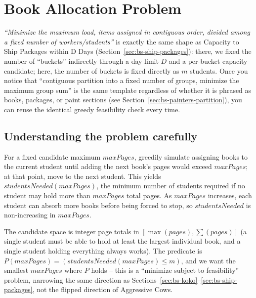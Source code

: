\section{Book Allocation Problem}
\label{sec:bs-book-allocation}


\begin{patternbox}
\emph{``Minimize the maximum load, items assigned in contiguous order,
divided among a fixed number of workers/students''} is exactly the same
shape as Capacity to Ship Packages within D Days
(Section~\ref{sec:bs-ship-packages}): there, we fixed the number of
``buckets'' indirectly through a day limit $D$ and a per-bucket capacity
candidate; here, the number of buckets is fixed directly as $m$ students.
Once you notice that ``contiguous partition into a fixed number of groups,
minimize the maximum group sum'' is the same template regardless of
whether it is phrased as books, packages, or paint sections (see
Section~\ref{sec:bs-painters-partition}), you can reuse the identical
greedy feasibility check every time.
\end{patternbox}

\subsection*{Understanding the problem carefully}

For a fixed candidate maximum $\textit{maxPages}$, greedily simulate
assigning books to the current student until adding the next book's pages
would exceed $\textit{maxPages}$; at that point, move to the next student.
This yields $\textit{studentsNeeded}(\textit{maxPages})$, the minimum
number of students required if no student may hold more than
$\textit{maxPages}$ total pages. As $\textit{maxPages}$ increases, each
student can absorb more books before being forced to stop, so
$\textit{studentsNeeded}$ is non-increasing in $\textit{maxPages}$.

\begin{ideabox}
The candidate space is integer page totals in
$[\max(\textit{pages}), \sum(\textit{pages})]$ (a single student must be
able to hold at least the largest individual book, and a single student
holding everything always works). The predicate is
$P(\textit{maxPages}) = (\textit{studentsNeeded}(\textit{maxPages}) \le
m)$, and we want the smallest $\textit{maxPages}$ where $P$ holds -- this
is a ``minimize subject to feasibility'' problem, narrowing the same
direction as Sections~\ref{sec:bs-koko}--\ref{sec:bs-ship-packages}, not
the flipped direction of Aggressive Cows.
\end{ideabox}


